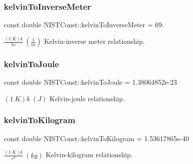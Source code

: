 \subsubsection{\texorpdfstring{kelvin\+To\+Inverse\+Meter}{kelvinToInverseMeter}}
{\footnotesize\ttfamily const double N\+I\+S\+T\+Const\+::kelvin\+To\+Inverse\+Meter = 69.}

$\frac{(1\ K)k}{hc} \ (\frac{1}{m})$ Kelvin-\/inverse meter relationship. \mbox{\label{group___kelvin_gae77577280e3dd4a78d41af37076c8f8d}} 
\subsubsection{\texorpdfstring{kelvin\+To\+Joule}{kelvinToJoule}}
{\footnotesize\ttfamily const double N\+I\+S\+T\+Const\+::kelvin\+To\+Joule = 1.\+38064852e-\/23}

$(1\ K)k \ (J)$ Kelvin-\/joule relationship. \mbox{\label{group___kelvin_gaf5fcf341c9c92f8ede2f402989ae8de1}} 
\subsubsection{\texorpdfstring{kelvin\+To\+Kilogram}{kelvinToKilogram}}
{\footnotesize\ttfamily const double N\+I\+S\+T\+Const\+::kelvin\+To\+Kilogram = 1.\+53617865e-\/40}

$\frac{(1\ K)k}{c^2} \ (kg)$ Kelvin-\/kilogram relationship. 